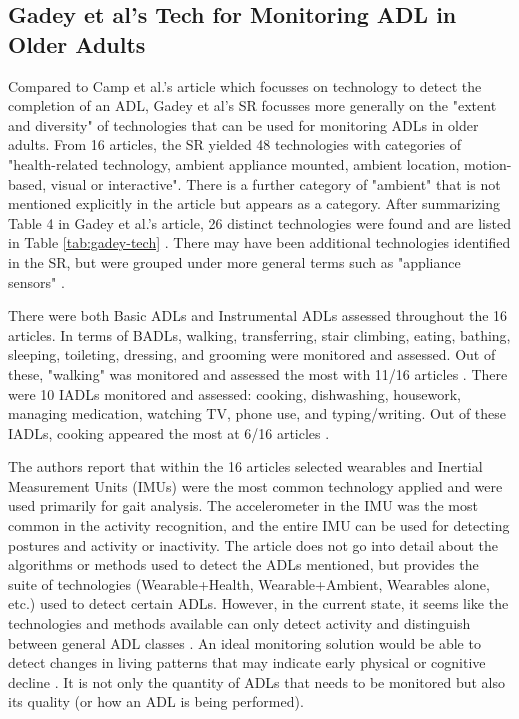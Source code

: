 \subsection{Gadey et al's Tech for Monitoring ADL in Older Adults}
Compared to Camp et al.'s article which focusses on technology to detect the completion of an ADL, Gadey et al's SR focusses more generally on the "extent and diversity" of technologies that can be used for monitoring ADLs in older adults. From 16 articles, the SR yielded 48 technologies with categories of "health-related technology, ambient appliance mounted, ambient location, motion-based, visual or interactive". There is a further category of "ambient" that is not mentioned explicitly in the article but appears as a category. After summarizing Table 4 in Gadey et al.'s article, 26 distinct technologies were found and are listed in Table \ref{tab:gadey-tech} \cite{gadey_technologies_2023}. There may have been additional technologies identified in the SR, but were grouped under more general terms such as "appliance sensors" \cite{gadey_technologies_2023}. 

There were both Basic ADLs and Instrumental ADLs assessed throughout the 16 articles. In terms of BADLs, walking, transferring, stair climbing, eating, bathing, sleeping, toileting, dressing, and grooming were monitored and assessed. Out of these, "walking" was monitored and assessed the most with 11/16 articles \cite{gadey_technologies_2023}. There were 10 IADLs monitored and assessed: cooking, dishwashing, housework, managing medication, watching TV, phone use, and typing/writing. Out of these IADLs, cooking appeared the most at 6/16 articles \cite{gadey_technologies_2023}.

The authors report that within the 16 articles selected wearables and Inertial Measurement Units (IMUs) were the most common technology applied and were used primarily for gait analysis. The accelerometer in the IMU was the most common in the activity recognition, and the entire IMU can be used for detecting postures and activity or inactivity. The article does not go into detail about the algorithms or methods used to detect the ADLs mentioned, but provides the suite of technologies (Wearable+Health, Wearable+Ambient, Wearables alone, etc.) used to detect certain ADLs. However, in the current state, it seems like the technologies and methods available can only detect activity and distinguish between general ADL classes \cite{gadey_technologies_2023}. An ideal monitoring solution would be able to detect changes in living patterns that may indicate early physical or cognitive decline \cite{gadey_technologies_2023}. It is not only the quantity of ADLs that needs to be monitored but also its quality (or how an ADL is being performed).

